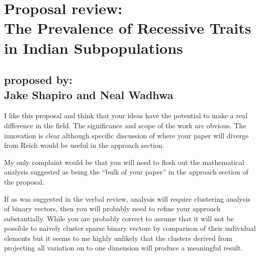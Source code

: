\documentclass[12pt,draft,a4paper]{article}
\begin{document}
 


\section*{Proposal review:\\ The Prevalence of Recessive Traits in Indian Subpopulations}
\subsection*{proposed by:\\ Jake Shapiro and Neal Wadhwa}



I like this proposal and think that your ideas have the potential to make a real difference in the field. The significance and scope of the work are obvious. The innovation is clear although specific discussion of where your paper will diverge from Reich would be useful in the approach section.

My only complaint would be that you will need to flesh out the mathematical analysis suggested as being the ``bulk of your paper'' in the approach section of the proposal. 

If as was suggested in the verbal review, analysis will require clustering analysis of binary vectors, then you will probably need to refine your approach substantially. While you are probably correct to assume that it will not be possible to naively cluster sparse binary vectors by comparison of their individual elements but it seems to me highly unlikely that the clusters derived from projecting all variation on to one dimension will produce a meaningful result.
\end{document}
